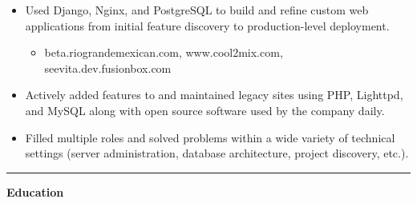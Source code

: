 \documentclass[11pt]{article}
\makeatletter
\newcommand{\headerrow}[2]
{\begin{tabular*}{\linewidth}{l@{\extracolsep{\fill}}r}
	#1 &
	#2 \\
\end{tabular*}}
\makeatother
\begin{document}
\vspace{-0.8em}
\begin{itemize}
	\item Used Django, Nginx, and PostgreSQL to build and refine custom web applications from initial feature discovery to production-level deployment.
	\vspace{-0.6em}
	\begin{itemize}
		\item beta.riograndemexican.com, www.cool2mix.com, seevita.dev.fusionbox.com
	\end{itemize}
	\vspace{-1.0em}
	\item Actively added features to and maintained legacy sites using PHP, Lighttpd, and MySQL along with open source software used by the company daily. 
	\vspace{-0.6em}
	\item Filled multiple roles and solved problems within a wide variety of technical settings (server administration, database architecture, project discovery, etc.).
\end{itemize}

%
%	

\vspace{0.2em}

\hrule
\vspace{0.6em}

\begin{LARGE}\bf{Education}\end{LARGE} \begin{Large}
	
\end{Large}
\end{document}
